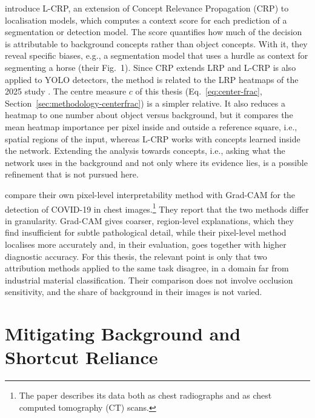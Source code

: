 \citet{dreyer2023revealing} introduce L-CRP, an extension of Concept
Relevance Propagation (CRP) \citep{achtibat2023crp} to localisation models, which computes a context score for
each prediction of a segmentation or detection model. The score quantifies how much of
the decision is attributable to background concepts rather than object concepts. With
it, they reveal specific biases, e.g., a segmentation model that uses a hurdle as
context for segmenting a horse (their Fig.~1). Since CRP extends LRP and L-CRP is also applied to YOLO
detectors, the method is related to the LRP heatmaps of the 2025
study \citep{schneidereitYOLOv8}. The centre
measure $c$ of this thesis (Eq.~\eqref{eq:center-frac},
Section~\ref{sec:methodology-centerfrac}) is a simpler relative. It also reduces a
heatmap to one number about object versus background, but it compares the mean heatmap
importance per pixel inside and outside a reference square, i.e., spatial regions of the
input, whereas L-CRP works with concepts learned inside the network. Extending the
analysis towards concepts, i.e., asking what the network uses in the background and not
only where its evidence lies, is a possible refinement that is not pursued here.

\citet{ennab2025interpretability} compare their own pixel-level
interpretability method with Grad-CAM for the detection of COVID-19 in chest
images.\footnote{The paper describes its data both as chest radiographs and as chest
computed tomography (CT) scans.} They report that the two methods differ in granularity.
Grad-CAM gives coarser, region-level explanations, which they find insufficient for
subtle pathological detail, while their pixel-level method localises more accurately
and, in their evaluation, goes together with higher diagnostic accuracy. For this
thesis, the relevant point is only that two attribution methods applied to the same
task disagree, in a domain far from industrial material
classification. Their comparison does not involve occlusion sensitivity, and the share
of background in their images is not varied.

\section{Mitigating Background and Shortcut Reliance}
\label{sec:related-work-mitigation}

